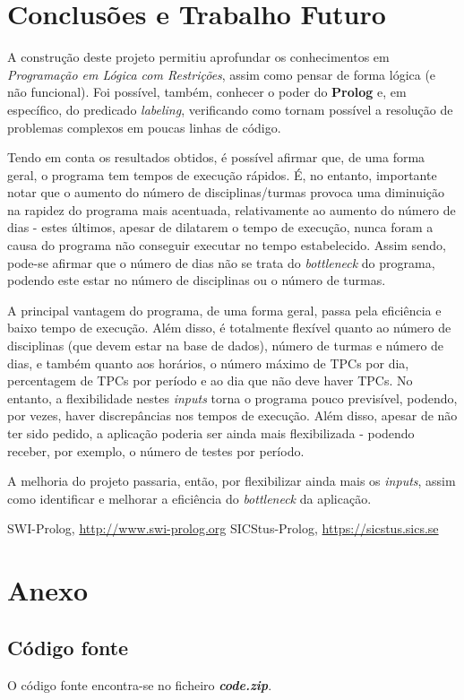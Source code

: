 \documentclass{llncs}
\begin{document}
\section{Conclusões e Trabalho Futuro}
A construção deste projeto permitiu aprofundar os conhecimentos em \textit{Programação em Lógica com Restrições}, assim como pensar de forma lógica (e não funcional). Foi possível, também, conhecer o poder do \textbf{Prolog} e, em específico, do predicado \textit{labeling}, verificando como tornam possível a resolução de problemas complexos em poucas linhas de código.\par
Tendo em conta os resultados obtidos, é possível afirmar que, de uma forma geral, o programa tem tempos de execução rápidos. É, no entanto, importante notar que o aumento do número de disciplinas/turmas provoca uma diminuição na rapidez do programa mais acentuada, relativamente ao aumento do número de dias - estes últimos, apesar de dilatarem o tempo de execução, nunca foram a causa do programa não conseguir executar no tempo estabelecido.\newline
Assim sendo, pode-se afirmar que o número de dias não se trata do \textit{bottleneck} do programa, podendo este estar no número de disciplinas ou o número de turmas.\par
A principal vantagem do programa, de uma forma geral, passa pela eficiência e baixo tempo de execução. Além disso, é totalmente flexível quanto ao número de disciplinas (que devem estar na base de dados), número de turmas e número de dias, e também quanto aos horários, o número máximo de TPCs por dia, percentagem de TPCs por período e ao dia que não deve haver TPCs.\newline
No entanto, a flexibilidade nestes \textit{inputs} torna o programa pouco previsível, podendo, por vezes, haver discrepâncias nos tempos de execução. Além disso, apesar de não ter sido pedido, a aplicação poderia ser ainda mais flexibilizada - podendo receber, por exemplo, o número de testes por período.\par
A melhoria do projeto passaria, então, por flexibilizar ainda mais os \textit{inputs}, assim como identificar e melhorar a eficiência do \textit{bottleneck} da aplicação.



%
%
\begin{thebibliography}{5}
%
SWI-Prolog,
\url{http://www.swi-prolog.org}
SICStus-Prolog,
\url{https://sicstus.sics.se}


\end{thebibliography}
\clearpage

\section*{Anexo}
\subsection*{Código fonte}
O código fonte encontra-se no ficheiro \textit{\textbf{code.zip}}.
\end{document}

